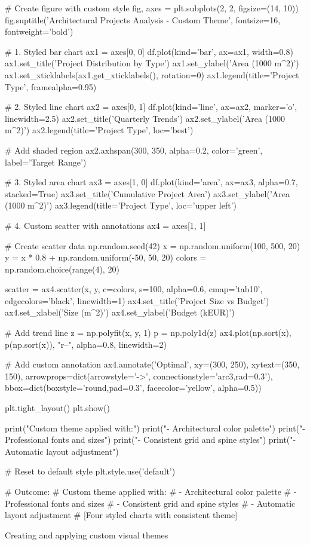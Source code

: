 {    # Create figure with custom style
    fig, axes = plt.subplots(2, 2, figsize=(14, 10))
    fig.suptitle('Architectural Projects Analysis - Custom Theme', 
                fontsize=16, fontweight='bold')
    
    # 1. Styled bar chart
    ax1 = axes[0, 0]
    df.plot(kind='bar', ax=ax1, width=0.8)
    ax1.set_title('Project Distribution by Type')
    ax1.set_ylabel('Area (1000 m^2)')
    ax1.set_xticklabels(ax1.get_xticklabels(), rotation=0)
    ax1.legend(title='Project Type', framealpha=0.95)
    
    # 2. Styled line chart
    ax2 = axes[0, 1]
    df.plot(kind='line', ax=ax2, marker='o', linewidth=2.5)
    ax2.set_title('Quarterly Trends')
    ax2.set_ylabel('Area (1000 m^2)')
    ax2.legend(title='Project Type', loc='best')
    
    # Add shaded region
    ax2.axhspan(300, 350, alpha=0.2, color='green', label='Target Range')
    
    # 3. Styled area chart
    ax3 = axes[1, 0]
    df.plot(kind='area', ax=ax3, alpha=0.7, stacked=True)
    ax3.set_title('Cumulative Project Area')
    ax3.set_ylabel('Area (1000 m^2)')
    ax3.legend(title='Project Type', loc='upper left')
    
    # 4. Custom scatter with annotations
    ax4 = axes[1, 1]
    
    # Create scatter data
    np.random.seed(42)
    x = np.random.uniform(100, 500, 20)
    y = x * 0.8 + np.random.uniform(-50, 50, 20)
    colors = np.random.choice(range(4), 20)
    
    scatter = ax4.scatter(x, y, c=colors, s=100, alpha=0.6, 
                         cmap='tab10', edgecolors='black', linewidth=1)
    ax4.set_title('Project Size vs Budget')
    ax4.set_xlabel('Size (m^2)')
    ax4.set_ylabel('Budget (kEUR)')
    
    # Add trend line
    z = np.polyfit(x, y, 1)
    p = np.poly1d(z)
    ax4.plot(np.sort(x), p(np.sort(x)), "r--", alpha=0.8, linewidth=2)
    
    # Add custom annotation
    ax4.annotate('Optimal\nRange', xy=(300, 250), xytext=(350, 150),
                arrowprops=dict(arrowstyle='->', connectionstyle='arc3,rad=0.3'),
                bbox=dict(boxstyle='round,pad=0.3', facecolor='yellow', alpha=0.5))
    
    plt.tight_layout()
    plt.show()
    
    print("Custom theme applied with:")
    print("- Architectural color palette")
    print("- Professional fonts and sizes")
    print("- Consistent grid and spine styles")
    print("- Automatic layout adjustment")
    
    # Reset to default style
    plt.style.use('default')
    
    # Outcome:
    # Custom theme applied with:
    # - Architectural color palette
    # - Professional fonts and sizes
    # - Consistent grid and spine styles
    # - Automatic layout adjustment
    # [Four styled charts with consistent theme]
}{Creating and applying custom visual themes}

